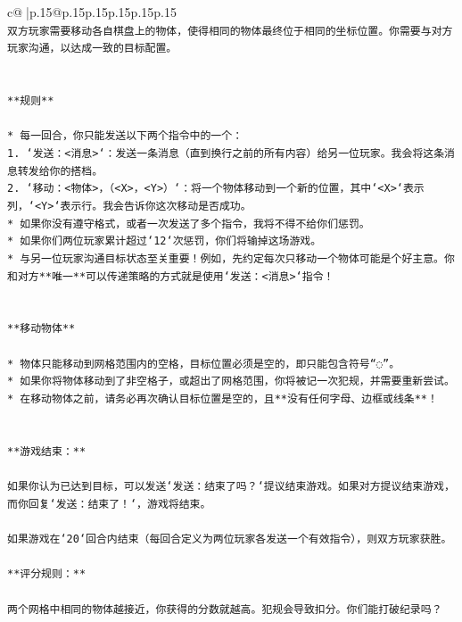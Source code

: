 \documentclass{article}
\begin{document}
{\begin{supertabular}{c@{$\;$}|p{.15\linewidth}@{}p{.15\linewidth}p{.15\linewidth}p{.15\linewidth}p{.15\linewidth}p{.15\linewidth}}
{{{\\ 
\texttt{双方玩家需要移动各自棋盘上的物体，使得相同的物体最终位于相同的坐标位置。你需要与对方玩家沟通，以达成一致的目标配置。} \\
\\ 
\\ 
\texttt{**规则**} \\
\\ 
\texttt{* 每一回合，你只能发送以下两个指令中的一个：} \\
\texttt{1. `发送：<消息>`：发送一条消息（直到换行之前的所有内容）给另一位玩家。我会将这条消息转发给你的搭档。} \\
\texttt{2. `移动：<物体>，（<X>，<Y>）`：将一个物体移动到一个新的位置，其中`<X>`表示列，`<Y>`表示行。我会告诉你这次移动是否成功。} \\
\texttt{* 如果你没有遵守格式，或者一次发送了多个指令，我将不得不给你们惩罚。} \\
\texttt{* 如果你们两位玩家累计超过`12`次惩罚，你们将输掉这场游戏。} \\
\texttt{* 与另一位玩家沟通目标状态至关重要！例如，先约定每次只移动一个物体可能是个好主意。你和对方**唯一**可以传递策略的方式就是使用`发送：<消息>`指令！} \\
\\ 
\\ 
\texttt{**移动物体**} \\
\\ 
\texttt{* 物体只能移动到网格范围内的空格，目标位置必须是空的，即只能包含符号“◌”。} \\
\texttt{* 如果你将物体移动到了非空格子，或超出了网格范围，你将被记一次犯规，并需要重新尝试。} \\
\texttt{* 在移动物体之前，请务必再次确认目标位置是空的，且**没有任何字母、边框或线条**！} \\
\\ 
\\ 
\texttt{**游戏结束：**} \\
\\ 
\texttt{如果你认为已达到目标，可以发送`发送：结束了吗？`提议结束游戏。如果对方提议结束游戏，而你回复`发送：结束了！`，游戏将结束。} \\
\\ 
\texttt{如果游戏在`20`回合内结束（每回合定义为两位玩家各发送一个有效指令），则双方玩家获胜。} \\
\\ 
\texttt{**评分规则：**} \\
\\ 
\texttt{两个网格中相同的物体越接近，你获得的分数就越高。犯规会导致扣分。你们能打破纪录吗？} \\
}}}
\end{supertabular}}
\end{document}
